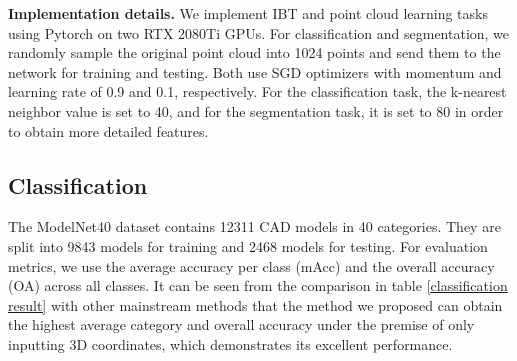 \documentclass[conference]{IEEEtran}
\begin{document}
{\bf Implementation details.} We implement IBT and point cloud learning tasks using Pytorch on two RTX 2080Ti GPUs. For classification and segmentation, we randomly sample the original point cloud into 1024 points and send them to the network for training and testing. Both use SGD optimizers with momentum and learning rate of 0.9 and 0.1, respectively. For the classification task, the k-nearest neighbor value is set to 40, and for the segmentation task, it is set to 80 in order to obtain more detailed features.

\vspace{-0.3cm}
\subsection{Classification} The ModelNet40 \cite{wu20153d} dataset contains 12311 CAD models in 40 categories. They are split into 9843 models for training and 2468 models for testing. For evaluation metrics, we use the average accuracy per class (mAcc) and the overall accuracy (OA) across all classes. It can be seen from the comparison in table \ref{classification result} with other mainstream methods that the method we proposed can obtain the highest average category and overall accuracy under the premise of only inputting 3D coordinates, which demonstrates its excellent performance.


\vspace{-3mm}
\begin{table}[h]
\caption{Classification results on ModelNet40.}
\begin{center}
\vspace{-2mm}
\end{center}
\vspace{-13pt}

\label{classification result}
\end{table}
\end{document}
